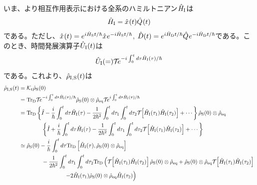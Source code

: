 \documentclass[10pt, a4paper]{jsarticle}
\begin{document}
いま、より相互作用表示における全系のハミルトニアン$\hat{H}_{\rm \rm I}$は
\begin{equation}
\begin{split}
\label{eq:501}
	\hat{H}_{\rm \rm I} = \hat{x}_{}(t) \hat{Q}_{}(t)
\end{split}
\end{equation}
である。ただし、$\hat{x}_{}(t) = e^{i \hat{H}_{\rm S} t / \hbar} \hat{x}_{} e^{- i \hat{H}_{\rm S} t / \hbar}$, $\hat{D}(t) = e^{i \hat{H}_{\rm D} t / \hbar} \hat{Q}_{} e^{- i \hat{H}_{\rm D} t / \hbar}$である。このとき、時間発展演算子$\hat{U}_{\rm \rm I}(t)$は
\begin{equation}
\begin{split}
\label{eq:502}
	\hat{U}_{\rm \rm I}(=) \mathcal{T}_{} e^{- i \int_{0}^{t} d\tau \hat{H}_{\rm \rm I}(\tau) / \hbar}
\end{split}
\end{equation}
である。これより、$\hat{\rho}_{\rm I,S}(t)$は
\begin{equation}
\begin{split}
\label{eq:503}
	\hat{\rho}_{\rm I,S}(t) &= \mathcal{K}_{t} \hat{\rho}_{\rm S}(0) \\
		&= {\rm Tr}_{\rm D}\mathcal{T}_{} e^{- i \int_{0}^{t} d\tau \hat{H}_{\rm \rm I}(\tau) / \hbar} \hat{\rho}_{\rm S}(0) \otimes \hat{\rho}_{\rm eq} \mathcal{T}_{} e^{i \int_{0}^{t} d\tau \hat{H}_{\rm \rm I}(\tau) / \hbar} \\
		&= {\rm Tr}_{\rm D} \left\{ \hat{I}_{\rm } - \dfrac{i}{\hbar} \int_{0}^{t} d\tau \hat{H}_{\rm \rm I}(\tau) - \dfrac{1}{2 \hbar^{2}} \int_{0}^{t} d\tau_{1} \int_{0}^{t} d\tau_{2} \mathcal{T}_{} \left[ \hat{H}_{\rm \rm I}(\tau_{1}) \hat{H}_{\rm \rm I}(\tau_{2}) \right] + \cdots \right\} \hat{\rho}_{\rm S}(0) \otimes \hat{\rho}_{\rm eq} \\
		&\qquad \qquad \left\{ \hat{I}_{\rm } + \dfrac{i}{\hbar} \int_{0}^{t} d\tau \hat{H}_{\rm \rm I}(\tau) - \dfrac{1}{2 \hbar^{2}} \int_{0}^{t} d\tau_{1} \int_{0}^{t} d\tau_{2} \mathcal{T}_{} \left[ \hat{H}_{\rm \rm I}(\tau_{1}) \hat{H}_{\rm \rm I}(\tau_{2}) \right] + \cdots \right\} \\
		&\simeq \hat{\rho}_{\rm S}(0) - \dfrac{i}{\hbar} \int_{0}^{t} d\tau {\rm Tr}_{\rm D}\left[ \hat{H}_{\rm \rm I}(\tau), \hat{\rho}_{\rm S}(0) \otimes \hat{\rho}_{\rm eq} \right] \\
		&\qquad \qquad - \dfrac{1}{2 \hbar^{2}} \int_{0}^{t} d\tau_{1} \int_{0}^{t} d\tau_{2} {\rm Tr}_{\rm D} \left( \mathcal{T}_{} \left[ \hat{H}_{\rm \rm I}(\tau_{1})\hat{H}_{\rm \rm I}(\tau_{2}) \right] \hat{\rho}_{\rm S}(0) \otimes \hat{\rho}_{\rm eq} + \hat{\rho}_{\rm S}(0) \otimes \hat{\rho}_{\rm eq} \mathcal{T}_{} \left[ \hat{H}_{\rm \rm I}(\tau_{1})\hat{H}_{\rm \rm I}(\tau_{2}) \right] \right. \\
		&\qquad \qquad \qquad \qquad \left. - 2 \hat{H}_{\rm \rm I}(\tau_{1}) \hat{\rho}_{\rm S}(0) \otimes \hat{\rho}_{\rm eq} \hat{H}_{\rm \rm I}(\tau_{2}) \right)
\end{split}
\end{equation}
\end{document}
